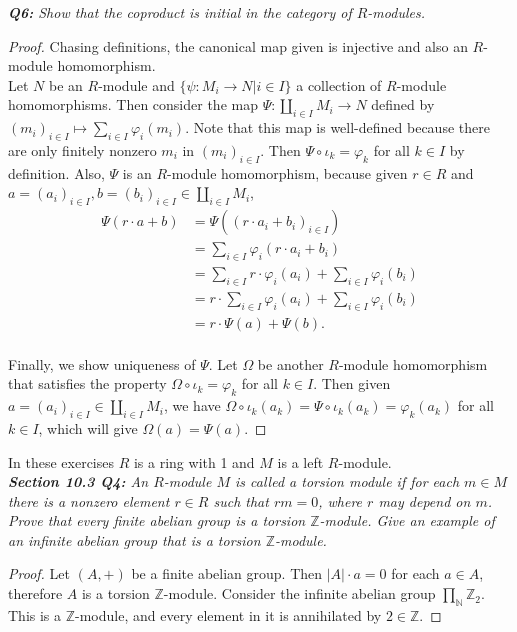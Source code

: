 \documentclass{article}
\begin{document}
\it \textbf{Q6:} Show that the coproduct is initial in the category of
  $R$-modules.
  \begin{proof}
    Chasing definitions, the canonical map given is injective and also an
    $R$-module homomorphism. \\

    Let $N$ be an $R$-module and $\{\psi:M_i\rightarrow N|i\in I\}$ a
    collection of $R$-module homomorphisms. Then consider the map
    $\Psi:\coprod_{i\in I}M_i\rightarrow N$ defined by $(m_i)_{i\in
    I}\mapsto \sum_{i\in I}\varphi_i(m_i)$. Note that this map is
    well-defined because there are only finitely nonzero $m_i$ in
    $(m_i)_{i\in I}$. Then $\Psi\circ\iota_k=\varphi_k$ for all $k\in I$ by
    definition. Also, $\Psi$ is an $R$-module homomorphism, because given
    $r\in R$ and $a=(a_i)_{i\in I}, b=(b_i)_{i\in I}\in\coprod_{i\in
    I}M_i$,
    \begin{align*}
      \Psi(r\cdot a+b) &=\Psi((r\cdot a_i+b_i)_{i\in I})\\
      &=\sum_{i\in I}\varphi_i(r\cdot a_i+b_i)\\
      &=\sum_{i\in I} r\cdot\varphi_i(a_i) +\sum_{i\in I}\varphi_i(b_i)\\
      &= r\cdot\sum_{i\in I}\varphi_i(a_i) +\sum_{i\in I}\varphi_i(b_i)\\
      &= r\cdot\Psi(a) +\Psi(b).\\
    \end{align*}

    Finally, we show uniqueness of $\Psi$. Let $\Omega$ be another
    $R$-module homomorphism that satisfies the property
    $\Omega\circ\iota_k=\varphi_k$ for all $k\in I$. Then given
    $a=(a_i)_{i\in I}\in\coprod_{i\in I}M_i$, we
    have $\Omega\circ\iota_k(a_k)=\Psi\circ\iota_k(a_k)=\varphi_k(a_k)$ for
    all $k\in I$, which will give $\Omega(a)=\Psi(a)$.
  \end{proof}

In these exercises $R$ is a ring with 1 and $M$ is a left $R$-module. \\

\it \textbf{Section 10.3 Q4:} An $R$-module $M$ is called a torsion module
  if for each $m\in M$ there is a nonzero element $r\in R$ such that
  $rm=0$, where $r$ may depend on $m$. Prove that every finite abelian
  group is a torsion $\mathbb{Z}$-module. Give an example of an infinite
  abelian group that is a torsion $\mathbb{Z}$-module.

  \begin{proof}
    Let $(A,+)$ be a finite abelian group. Then $|A|\cdot a=0$ for each
    $a\in A$, therefore $A$ is a torsion $\mathbb{Z}$-module. Consider the
    infinite abelian group $\prod_{\mathbb{N}}\mathbb{Z}_2$. This is a
    $\mathbb{Z}$-module, and every element in it is annihilated by
    $2\in\mathbb{Z}$.
  \end{proof}
\end{document}
